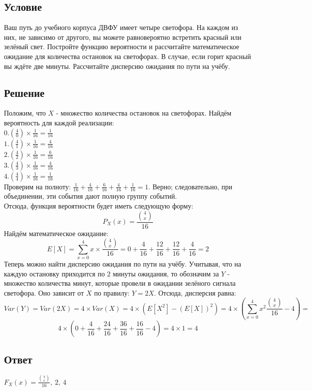 \documentclass{article}
\begin{document}
\subsection*{Условие}
Ваш путь до учебного корпуса ДВФУ имеет четыре светофора. На каждом
из них, не зависимо от другого, вы можете равновероятно встретить красный или
зелёный свет. Постройте функцию вероятности и рассчитайте математическое
ожидание для количества остановок на светофорах. В случае, если горит красный вы
ждёте две минуты. Рассчитайте дисперсию ожидания по пути на учёбу. 
\subsection*{Решение}
Положим, что $X$ - множество количества остановок на светофорах. Найдём вероятность для каждой реализации:\\
$0. \left(\frac{4}{0}\right) \times \frac{1}{16} = \frac{1}{16}$\\
$1. \left(\frac{4}{1}\right) \times \frac{1}{16} = \frac{4}{16}$\\
$2. \left(\frac{4}{2}\right) \times \frac{1}{16} = \frac{6}{16}$\\
$3. \left(\frac{4}{3}\right) \times \frac{1}{16} = \frac{4}{16}$\\
$4. \left(\frac{4}{4}\right) \times \frac{1}{16} = \frac{1}{16}$\\
Проверим на полноту: $\frac{1}{16} + \frac{4}{16} + \frac{6}{16} + \frac{4}{16} + \frac{1}{16} = 1$. Верно; следовательно, при объединении, эти события дают полную группу событий.\\
Отсюда, функция вероятности будет иметь следующую форму:
\[
    P_X(x)=\frac{\binom{4}{x}}{16}
\]
Найдём математическое ожидание:
\[
    E[X] = \sum_{x=0}^{4}x \times \frac{\binom{4}{x}}{16} = 0 + \frac{4}{16} + \frac{12}{16} + \frac{12}{16} + \frac{4}{16} = 2
\]
Теперь можно найти дисперсию ожидания по пути на учёбу. Учитывая, что на каждую остановку приходится по 2 минуты ожидания, то обозначим за $Y$ - множество количества минут, которые провели в ожидании зелёного сигнала светофора. Оно зависит от $X$ по правилу: $Y=2X$.
Отсюда, дисперсия равна:
\[
   Var(Y) = Var(2X)= 4 \times Var(X) = 4 \times \left(E[X^2] - (E[X])^2\right) = 4 \times \left(\sum_{x=0}^{4} x^2\frac{\binom{4}{x}}{16} - 4\right) =
\]
\[
    4 \times \left(0 + \frac{4}{16} + \frac{24}{16} + \frac{36}{16} + \frac{16}{16} - 4 \right) = 4 \times 1 = 4
\]
\subsection*{Ответ}
$F_X(x) = \frac{\binom{4}{x}}{16}, \ 2, \ 4 $
\end{document}
